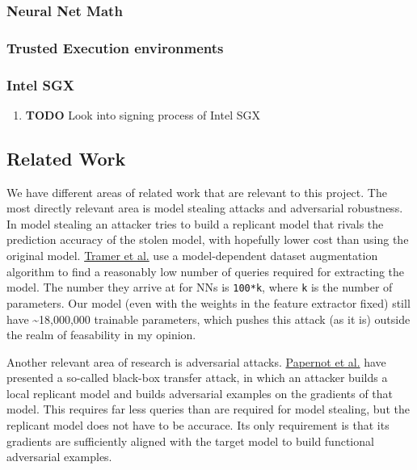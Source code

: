\documentclass[11pt]{article}
\begin{document}
\subsubsection{Neural Net Math}
\label{sec:org25637c1}

\subsubsection{Trusted Execution environments}
\label{sec:orgc3f4848}

\subsubsection{Intel SGX}
\label{sec:org3988408}
\begin{enumerate}
\item {\bfseries\sffamily TODO} Look into signing process of Intel SGX
\label{sec:orgce18453}
\end{enumerate}

\subsection{Related Work}
\label{sec:org592c409}
\label{org9a57082}
We have different areas of related work that are relevant to this project.
The most directly relevant area is model stealing attacks and adversarial robustness.
In model stealing an attacker tries to build a replicant model that rivals the prediction accuracy of the stolen model, with hopefully lower cost than using the original model.
\href{related\_work/tramer16stealing.pdf}{Tramer et al.} use a model-dependent dataset augmentation algorithm to find a reasonably low number of queries required for extracting the model.
The number they arrive at for NNs is \texttt{100*k}, where \texttt{k} is the number of parameters.
Our model (even with the weights in the feature extractor fixed) still have \textasciitilde{}18,000,000 trainable parameters, which pushes this attack (as it is) outside the realm of feasability in my opinion.

Another relevant area of research is adversarial attacks.
\href{related\_work/papernot17practical.pdf}{Papernot et al.} have presented a so-called black-box transfer attack, in which an attacker builds a local replicant model and builds adversarial examples on the gradients of that model.
This requires far less queries than are required for model stealing, but the replicant model does not have to be accurace.
Its only requirement is that its gradients are sufficiently aligned with the target model to build functional adversarial examples.
\end{document}
